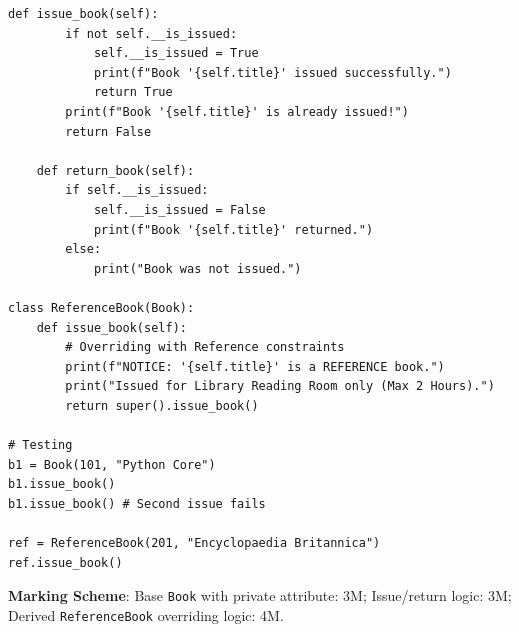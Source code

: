 \begin{solutionbox}
\begin{enumerate}[start=7]
\begin{lstlisting}[language=Python3]
    def issue_book(self):
        if not self.__is_issued:
            self.__is_issued = True
            print(f"Book '{self.title}' issued successfully.")
            return True
        print(f"Book '{self.title}' is already issued!")
        return False
        
    def return_book(self):
        if self.__is_issued:
            self.__is_issued = False
            print(f"Book '{self.title}' returned.")
        else:
            print("Book was not issued.")

class ReferenceBook(Book):
    def issue_book(self):
        # Overriding with Reference constraints
        print(f"NOTICE: '{self.title}' is a REFERENCE book.")
        print("Issued for Library Reading Room only (Max 2 Hours).")
        return super().issue_book()

# Testing
b1 = Book(101, "Python Core")
b1.issue_book()
b1.issue_book() # Second issue fails

ref = ReferenceBook(201, "Encyclopaedia Britannica")
ref.issue_book()
\end{lstlisting}
\textbf{Marking Scheme}: Base \texttt{Book} with private attribute: 3M; Issue/return logic: 3M; Derived \texttt{ReferenceBook} overriding logic: 4M.
\end{enumerate}
\end{solutionbox}

